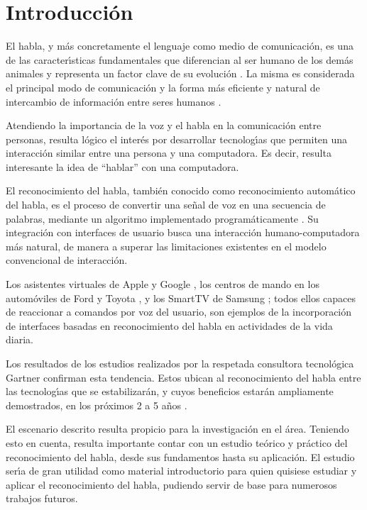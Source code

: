 \chapter{Introducci\'on}
\label{sec:intro}

El habla, y m\'as concretamente el lenguaje como medio de comunicaci\'on, es una
de las caracter{\'\i}sticas fundamentales que diferencian al ser humano de los dem\'as
animales y representa un factor clave de su evoluci\'on \cite{SchepartzLanguage1993}. La misma es considerada
el principal modo de comunicaci\'on y la forma m\'as eficiente y natural de intercambio 
de informaci\'on entre seres humanos \cite{GaikwadAReview2010}.

Atendiendo la importancia de la voz y el habla en la comunicaci\'on entre personas,
resulta l\'ogico el inter\'es por desarrollar tecnolog{\'\i}as que permiten una interacci\'on
similar entre una persona y una computadora. Es decir, resulta interesante la idea 
de ``hablar'' con una computadora.

El reconocimiento del habla, tambi\'en conocido como reconocimiento autom\'atico del habla,
es el proceso de convertir una se\~nal de voz en una secuencia de
palabras, mediante un algoritmo implementado program\'aticamente \cite{JaisalAReview2012}. 
Su integraci\'on con interfaces de usuario busca una interacci\'on humano-computadora m\'as
natural, de manera a superar las limitaciones existentes en el modelo convencional
de interacci\'on.

Los asistentes virtuales de Apple \cite{AppleSiri} y Google \cite{GoogleNow}, 
los centros de mando en los autom\'oviles de Ford \cite{FordSync} y Toyota \cite{ToyotaEntune},
y los SmartTV de Samsung \cite{SamsungVoiceControl}; todos ellos capaces de reaccionar a 
comandos por voz del usuario, son ejemplos de la incorporaci\'on de interfaces basadas 
en reconocimiento del habla en actividades de la vida diaria.

Los resultados de los estudios realizados por la respetada consultora tecnol\'ogica
Gartner confirman esta tendencia. Estos ubican al reconocimiento del habla entre
las tecnolog{\'\i}as que se estabilizar\'an, y cuyos beneficios estar\'an ampliamente
demostrados, en los pr\'oximos 2 a 5 a\~nos \cite{Gartner2013}. 

El escenario descrito resulta propicio para la investigaci\'on en el \'area.
Teniendo esto en cuenta, resulta importante contar con un estudio te\'orico
y pr\'actico del reconocimiento del habla, desde sus fundamentos hasta su
aplicaci\'on. El estudio ser{\'\i}a de gran utilidad como material introductorio
para quien quisiese estudiar y aplicar el reconocimiento del habla, pudiendo
servir de base para numerosos trabajos futuros.

